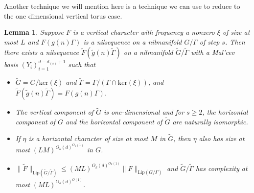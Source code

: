 \documentclass[11pt, a4paper]{amsart}
\theoremstyle{plain}
\theoremstyle{plain}
\newtheorem{lemma}{Lemma}
\theoremstyle{definition}
\theoremstyle{remark}
\numberwithin{equation}{section}
\numberwithin{lemma}{section}
\numberwithin{proposition}{section}
\numberwithin{corollary}{section}
\numberwithin{definition}{section}
\numberwithin{claim}{section}
\begin{document}
Another technique we will mention here is a technique we can use to reduce to the one dimensional vertical torus case. 
\begin{lemma}\label{l:trick2}
Suppose $F$ is a vertical character with frequency a nonzero $\xi$ of size at most $L$ and $F(g(n)\Gamma)$ is a nilsequence on a nilmanifold $G/\Gamma$ of step $s$. Then there exists a nilsequence $\tilde{F}(\tilde{g}(n)\tilde{\Gamma})$ on a nilmanifold $\tilde{G}/\tilde{\Gamma}$ with a Mal'cev basis $(Y_i)_{i = 1}^{d - d_{(s)} + 1}$ such that
\begin{itemize}
    \item $\tilde{G} = G/\mathrm{ker}(\xi)$ and $\tilde{\Gamma} = \Gamma/(\Gamma \cap \mathrm{ker}(\xi))$, and $\tilde{F}(\tilde{g}(n)\tilde{\Gamma}) = F(g(n)\Gamma)$.
    \item The vertical component of $\tilde{G}$ is one-dimensional and for $s \ge 2$, the horizontal component of $G$ and the horizontal component of $\tilde{G}$ are naturally isomorphic. 
    \item If $\eta$ is a horizontal character of size at most $M$ in $\tilde{G}$, then $\eta$ also has size at most $(LM)^{O_k(d)^{O_k(1)}}$ in $G$.
    \item $\|\tilde{F}\|_{\mathrm{Lip}(\tilde{G}/\tilde{\Gamma})} \le (ML)^{O_k(d)^{O_k(1)}}\|F\|_{\mathrm{Lip}(G/\Gamma)}$ and $\tilde{G}/\tilde{\Gamma}$ has complexity at most $(ML)^{O_k(d)^{O(1)}}$.
\end{itemize}
\end{lemma}
\end{document}
